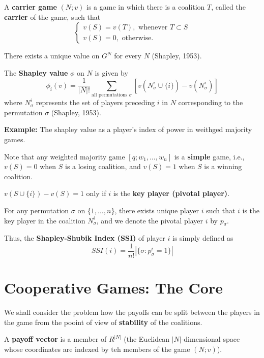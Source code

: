 \documentclass[11pt,a4paper]{article}
\begin{document}
A \textbf{carrier game} $(N; v)$ is a game in which there is a coalition $T$, called the \textbf{carrier} of the game, such that
\[
\begin{cases}
    v(S) = v(T), \text{  whenever } T \subset S \\
    v(S) = 0, \text{  otherwise.}
\end{cases}
\]

There exists a unique value on $G^N$ for every $N$ (Shapley, 1953). \par
The \textbf{Shapley value} $\phi$ on $N$ is given by
\[
\phi_i(v) = \frac{1}{|N|!} \sum_{\text{all permutations } \sigma} \left[v(N_{\sigma}^i \cup \{i\}) - v(N_{\sigma}^i)\right]
\]
where $N_{\sigma}^i$ represents the set of players preceding $i$ in $N$ corresponding to the permutation $\sigma$ (Shapley, 1953). \par


\textbf{Example:} The shapley value as a player's index of power in weithged majority games. \par

Note that any weighted majority game $[q; w_1, \dots, w_n]$ is a \textbf{simple} game, i.e., $v(S) = 0$ when $S$ is a losing coalition, and $v(S) = 1$ when $S$ is a winning coalition. \par
$v(S \cup \{i\}) - v(S) = 1$ only if $i$ is the \textbf{key player (pivotal player)}. \par
For any permutation $\sigma$ on $\{1, \dots, n\}$, there exists unique player $i$ such that $i$ is the key player in the coalition $N_{\sigma}^i$, and we denote the pivotal player $i$ by $p_{\sigma}$. \par
Thus, the \textbf{Shapley-Shubik Index (SSI)} of player $i$ is simply defined as
\[
SSI(i) = \frac{1}{n!} \left|\{\sigma: p_{\sigma}^i = 1\}\right|
\]

\section{Cooperative Games: The Core}
We shall consider the problem how the payoffs can be split between the players in the game from the pooint of view of \textbf{stability} of the coalitions. \par

A \textbf{payoff vector} is a member of $R^{|N|}$ (the Euclidean $|N|$-dimensional space whose coordinates are indexed by teh members of the game $(N; v)$). \par
\end{document}
